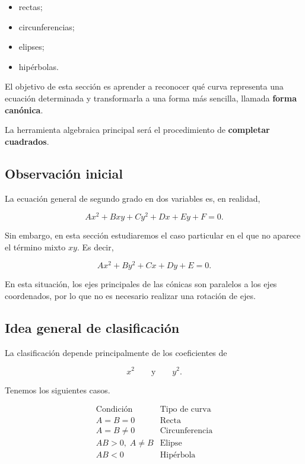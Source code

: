 \documentclass[12pt]{article}
\begin{document}
{\begin{itemize}
    \item rectas;
    \item circunferencias;
    \item elipses;
    \item hipérbolas.
\end{itemize}

El objetivo de esta sección es aprender a reconocer qué curva representa
una ecuación determinada y transformarla a una forma más sencilla,
llamada \textbf{forma canónica}.

La herramienta algebraica principal será el procedimiento de
\textbf{completar cuadrados}.

\subsection{Observación inicial}

La ecuación general de segundo grado en dos variables es, en realidad,

\[
Ax^2+Bxy+Cy^2+Dx+Ey+F=0.
\]

Sin embargo, en esta sección estudiaremos el caso particular en el que no
aparece el término mixto \(xy\). Es decir,

\[
\boxed{
Ax^2+By^2+Cx+Dy+E=0
}.
\]

En esta situación, los ejes principales de las cónicas son paralelos a
los ejes coordenados, por lo que no es necesario realizar una rotación
de ejes.

\subsection{Idea general de clasificación}

La clasificación depende principalmente de los coeficientes de

\[
x^2
\qquad\text{y}\qquad
y^2.
\]

Tenemos los siguientes casos.

\[
\boxed{
\begin{array}{c|c}
\text{Condición} & \text{Tipo de curva}\\
\hline
A=B=0 & \text{Recta}\\
A=B\neq0 & \text{Circunferencia}\\
AB>0,\;A\neq B & \text{Elipse}\\
AB<0 & \text{Hipérbola}
\end{array}
}
\]

}
\end{document}
